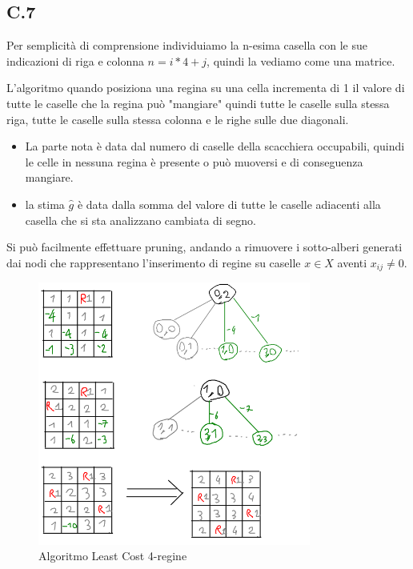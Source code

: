 \documentclass[a4paper]{article}
\begin{document}
\subsection{C.7}
Per semplicità di comprensione individuiamo la n-esima casella con le sue indicazioni di riga e colonna $n = i*4 + j$, quindi la vediamo come una matrice.

L'algoritmo quando posiziona una regina su una cella incrementa di 1 il valore di tutte le caselle che la regina può "mangiare" quindi tutte le caselle sulla stessa riga, tutte le caselle sulla stessa colonna e le righe sulle due diagonali.
\begin{itemize}
	\item La parte nota è data dal numero di caselle della scacchiera occupabili, quindi le celle in nessuna regina è presente o può muoversi e di conseguenza mangiare.
	\item la stima $\hat g$ è data dalla somma del valore di tutte le caselle adiacenti alla casella che si sta analizzano cambiata di segno.
\end{itemize}
Si può facilmente effettuare pruning, andando a rimuovere i sotto-alberi generati dai nodi che rappresentano l'inserimento di regine su caselle $x \in X$ aventi $x_{ij} \neq 0$.\\
\begin{figure}[!ht]
\centering
\includegraphics[width=0.8\textwidth]{./img/C7.png}
\caption{Algoritmo Least Cost 4-regine} \label{FIG:C7}
\end{figure}\\
\end{document}
